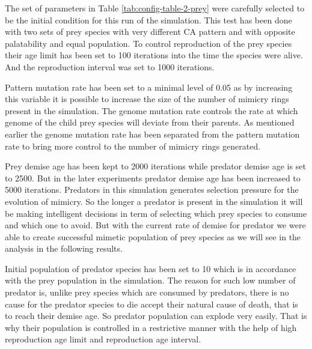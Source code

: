 The set of parameters in Table \ref{tab:config-table-2-prey} were carefully selected to be the initial condition for this run of the simulation. This test has been done with two sets of prey species with very different CA pattern and with opposite palatability and equal population. To control reproduction of the prey species their age limit has been set to 100 iterations into the time the species were alive. And the reproduction interval was set to 1000 iterations.

Pattern mutation rate has been set to a minimal level of 0.05 as by increasing this variable it is possible to increase the size of the number of mimicry rings present in the simulation. The genome mutation rate controls the rate at which genome of the child prey species will deviate from their parents. As mentioned earlier the genome mutation rate has been separated from the pattern mutation rate to bring more control to the number of mimicry rings generated.

Prey demise age has been kept to 2000 iterations while predator demise age is set to 2500. But in the later experiments predator demise age has been increased to 5000 iterations. Predators in this simulation generates selection pressure for the evolution of mimicry. So the longer a predator is present in the simulation it will be making intelligent decisions in term of selecting which prey species to consume and which one to avoid. But with the current rate of demise for predator we were able to create successful mimetic population of prey species as we will see in the analysis in the following results.

Initial population of predator species has been set to 10 which is in accordance with the prey population in the simulation. The reason for such low number of predator is, unlike prey species which are consumed by predators, there is no cause for the predator species to die accept their natural cause of death, that is to reach their demise age. So predator population can explode very easily. That is why their population is controlled in a restrictive manner with the help of high reproduction age limit and reproduction age interval.

